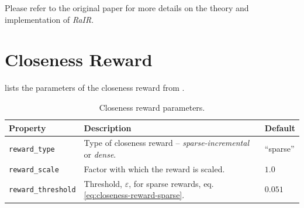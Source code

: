 Please refer to the original paper for more details on the theory and implementation of \emph{RaIR}.

\section{Closeness Reward}
\label{sec:closeness-reward-details}

 lists the parameters of the closeness reward from .
\begin{table}[H]
    \centering
    \caption{Closeness reward parameters.}
    \begin{tabularx}{\textwidth}{C{3.9cm} L C{2cm}}
        \hline
        Property & Description & Default\\
        \hline
        \texttt{reward\_type} & Type of closeness reward -- \emph{sparse-incremental} or \emph{dense}. & ``sparse''\\
        \texttt{reward\_scale} & Factor with which the reward is scaled. & \(1.0\)\\
        \texttt{reward\_threshold} & Threshold, \(\varepsilon\), for sparse rewards, eq. \eqref{eq:closeness-reward-sparse}. & \(0.051\)\\
        \hline
    \end{tabularx}
    \label{tab:closeness-reward-params}
\end{table}


